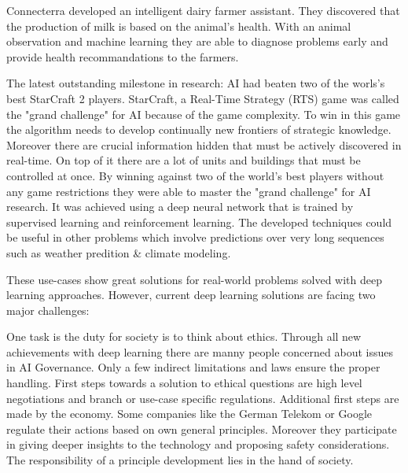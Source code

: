 Connecterra developed an intelligent dairy farmer assistant.
They discovered that the production of milk is based on the animal’s health.
With an animal observation and machine learning they are able to diagnose problems early and provide health recommandations to the farmers.
\cite{tensorflow-stories, connecterra-video, connecterra-web}

The latest outstanding milestone in research: AI had beaten two of the worls's best StarCraft 2 players.
StarCraft, a Real-Time Strategy (RTS) game was called the "grand challenge" for AI because of the game complexity.
To win in this game the algorithm needs to develop continually new frontiers of strategic knowledge.
Moreover there are crucial information hidden that must be actively discovered in real-time. On top of it there are a lot of units and buildings that must be controlled at once.
By winning against two of the world's best players without any game restrictions they were able to master the "grand challenge" for AI research.
It was achieved using a deep neural network that is trained by supervised learning and reinforcement learning.
The developed techniques could be useful in other problems which involve predictions over very long sequences such as weather predition \& climate modeling.
\cite{alphastar}

These use-cases show great solutions for real-world problems solved with deep learning approaches.
However, current deep learning solutions are facing two major challenges:

One task is the duty for society is to think about ethics.
Through all new achievements with deep learning there are manny people concerned about issues in AI Governance.
Only a few indirect limitations and laws ensure the proper handling.
First steps towards a solution to ethical questions are high level negotiations and branch or use-case specific regulations. \cite[page 3]{google-ai-governance}
Additional first steps are made by the economy.
Some companies like the German Telekom \cite{telekom-ai-guidelines} or Google \cite{google-ai-principles} regulate their actions based on own general principles.
Moreover they participate in giving deeper insights to the technology and proposing safety considerations.
\cite{google-ai-governance}
The responsibility of a principle development lies in the hand of society.

